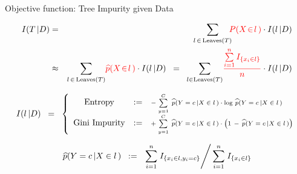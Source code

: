 \normalsize


\begin{frame}{\vskip -0.2cm \large Objective function: Tree Impurity given Data}

\vskip -0.3cm

\begin{eqnarray*}
I(T\,\vert D)
& = &
	\underset{l\,\in\,\textnormal{Leaves}(T)}{\sum}\!\!
	{\color{red}P(X \!\in\! l\,)} \cdot I(l\,\vert D)
\\
& \approx &
	\underset{l\,\in\,\textnormal{Leaves}(T)}{\sum}
	{\color{red}\widehat{p}(X \!\in\! l\,)} \cdot I(l\,\vert D)
\;\; = \;\;
	\underset{l\in\textnormal{Leaves}(T)}{\sum}
	{\color{red}\dfrac{\overset{n}{\underset{i=1}{\sum}}\,I_{\{x_{i} \in l\}}}{n}} \cdot I(l\,\vert D)
\end{eqnarray*}

\small
\begin{equation*}
I(l\,\vert D)
\;\; = \;\;
\left\{\begin{array}{ccl}
\textnormal{Entropy}
& := &
	\textnormal{\scriptsize$-\;\overset{C}{\underset{y=1}{\sum}}\;\,
	\widehat{p}(Y=c\,\vert X\in l\,) \cdot \log\,\widehat{p}(Y=c\,\vert X\in l\,)$}
\\
\textnormal{Gini Impurity}
& := &
	\textnormal{\scriptsize$+\;\overset{C}{\underset{y=1}{\sum}}\;\,
	\widehat{p}(Y=c\,\vert X\in l\,) \cdot
	\left(\overset{{\color{white}.}}{1}\,-\,\widehat{p}(Y=c\,\vert X\in l\,)\right)$}
\end{array}\right.
\end{equation*}

\vskip -0.5cm

\footnotesize
\begin{equation*}
\widehat{p}(Y=c\,\vert X\in l\,)
\;\; := \;\;
	\left.\overset{n}{\underset{i=1}{\sum}}\; I_{\{x_{i}\in l, y_{i} = c\}} \right\slash
	\overset{n}{\underset{i=1}{\sum}}\; I_{\{x_{i}\in l\}}
\end{equation*}

\end{frame}
\normalsize


